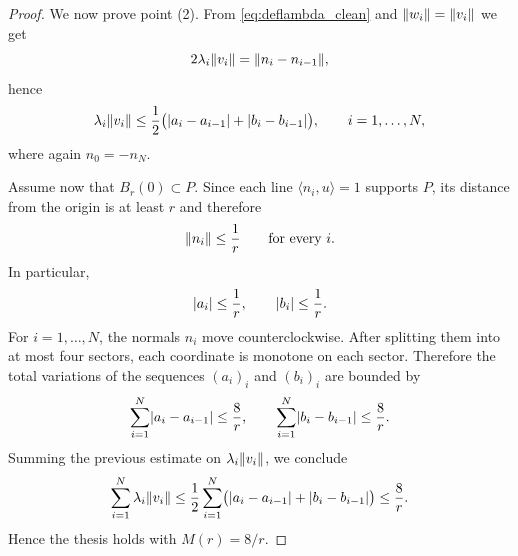 \documentclass{article}
\numberwithin{equation}{section}
\theoremstyle{plain}%
\theoremstyle{definition}
\theoremstyle{definition}
\DeclarePairedDelimiter{\norma}{\lVert}{\rVert} %
\DeclarePairedDelimiter{\valass}{\lvert}{\rvert} %
\newcommand{\prodscal}[2]{\langle{#1} , {#2} \rangle}
\begin{document}
\begin{proof}
We now prove point (2). From \eqref{eq:deflambda_clean} and $\norma{w_i}=\norma{v_i}$ we get
$$
2\lambda_i \norma{v_i} = \norma{n_i-n_{i-1}},
$$
hence
$$
\lambda_i\norma{v_i}
\le
\frac12\bigl(\valass{a_i-a_{i-1}}+\valass{b_i-b_{i-1}}\bigr),
\qquad i=1,\dots,N,
$$
where again $n_0=-n_N$.

Assume now that $B_r(0)\subset P$. Since each line $\prodscal{n_i}{u}=1$ supports $P$, its distance from the origin is at least $r$ and therefore
$$
\norma{n_i}\le \frac1r
\qquad\text{for every }i.
$$
In particular,
$$
\valass{a_i}\le \frac1r,
\qquad
\valass{b_i}\le \frac1r.
$$
For $i=1,\dots,N$, the normals $n_i$ move counterclockwise. After splitting them into at most four sectors, each coordinate is monotone on each sector. Therefore the total variations of the sequences $(a_i)_i$ and $(b_i)_i$ are bounded by
$$
\sum_{i=1}^{N}\valass{a_i-a_{i-1}}\le \frac{8}{r},
\qquad
\sum_{i=1}^{N}\valass{b_i-b_{i-1}}\le \frac{8}{r}.
$$
Summing the previous estimate on $\lambda_i\norma{v_i}$, we conclude
$$
\sum_{i=1}^{N}\lambda_i\norma{v_i}
\le
\frac12
\sum_{i=1}^{N}\bigl(\valass{a_i-a_{i-1}}+\valass{b_i-b_{i-1}}\bigr)
\le \frac{8}{r}.
$$
Hence the thesis holds with $M(r)=8/r$.
\end{proof}
\end{document}
